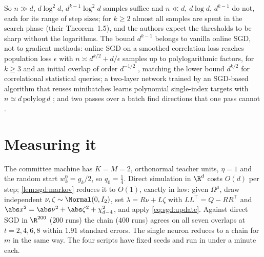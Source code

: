 \begin{refsection}
So $n\gg d$, $d\log^2d$, $d^{k-1}\log^2d$ samples suffice and $n\ll d$, $d\log d$, $d^{k-1}$ do not, each for its range of step sizes; for $k\ge2$ almost all samples are spent in the search phase (their Theorem~1.5), and the authors expect the thresholds to be sharp without the logarithms. The bound $d^{k-1}$ belongs to vanilla online SGD, not to gradient methods: online SGD on a smoothed correlation loss reaches population loss $\epsilon$ with $n\asymp d^{k/2}+d/\epsilon$ samples up to polylogarithmic factors, for $k\ge3$ and an initial overlap of order $d^{-1/2}$ \parencite[Theorem~1]{DamianEtAl2023}, matching the lower bound $d^{k/2}$ for correlational statistical queries; a two-layer network trained by an SGD-based algorithm that reuses minibatches learns polynomial single-index targets with $n\simeq d\,\mathrm{polylog}\,d$ \parencite{LeeEtAl2024}; and two passes over a batch find directions that one pass cannot \parencite{DandiEtAl2024b}.

\section{Measuring it}\label{sec:sgd:measuring}

The committee machine has $K=M=2$, orthonormal teacher units, $\eta=1$ and the random start $w^0_k=g_k/2$, so $q_0=\frac14$. Direct simulation in $\R^d$ costs $O(d)$ per step; \cref{lem:sgd:markov} reduces it to $O(1)$, exactly in law: given $\Omega^\mu$, draw independent $\nu,\zeta\sim\Normal(0,I_2)$, set $\lambda=R\nu+L\zeta$ with $LL^\top=Q-RR^\top$ and $\abs x^2=\abs\nu^2+\abs\zeta^2+\chi^2_{d-4}$, and apply \eqref{eq:sgd:update}. Against direct SGD in $\R^{200}$ ($200$ runs) the chain ($400$ runs) agrees on all seven overlaps at $t=2,4,6,8$ within $1.91$ standard errors. The single neuron reduces to a chain for $m$ in the same way. The four scripts have fixed seeds and run in under a minute each.


\end{refsection}
